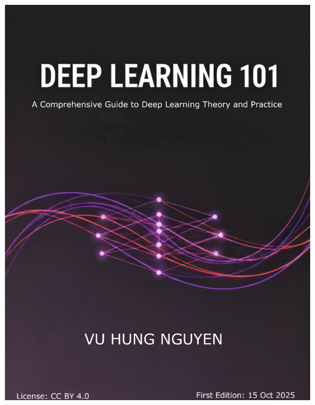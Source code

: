 \documentclass[10pt,\papersize,twoside,openright]{book}
\begin{document}
{{{{{          \includegraphics[width=\paperwidth,height=\paperheight]{images/DeepLearning101-cover-letter.png}%
        }{%
          }}}}}
\end{document}
